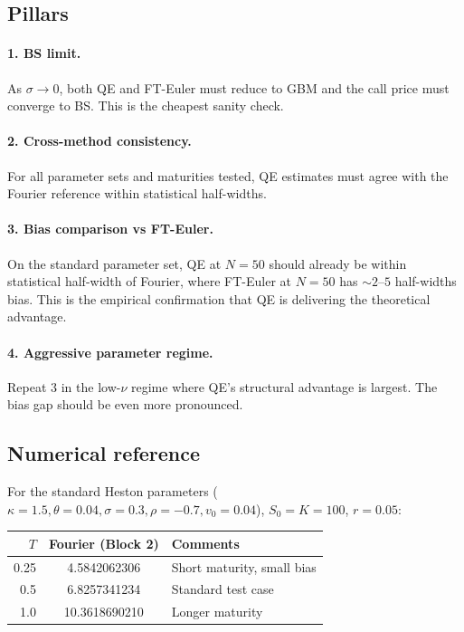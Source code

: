\documentclass[11pt]{article}
\theoremstyle{plain}
\theoremstyle{definition}
\theoremstyle{remark}
\begin{document}
\subsection{Pillars}

\paragraph{1. BS limit.} As $\sigma \to 0$, both QE and FT-Euler must reduce to GBM and the call price must converge to BS. This is the cheapest sanity check.

\paragraph{2. Cross-method consistency.} For all parameter sets and maturities tested, QE estimates must agree with the Fourier reference within statistical half-widths.

\paragraph{3. Bias comparison vs FT-Euler.} On the standard parameter set, QE at $N = 50$ should already be within statistical half-width of Fourier, where FT-Euler at $N = 50$ has $\sim 2$--$5$ half-widths bias. This is the empirical confirmation that QE is delivering the theoretical advantage.

\paragraph{4. Aggressive parameter regime.} Repeat 3 in the low-$\nu$ regime where QE's structural advantage is largest. The bias gap should be even more pronounced.

\subsection{Numerical reference}

For the standard Heston parameters ($\kappa = 1.5, \theta = 0.04, \sigma = 0.3, \rho = -0.7, v_0 = 0.04$), $S_0 = K = 100$, $r = 0.05$:

\begin{center}
\begin{tabular}{rcl}
\toprule
$T$ & Fourier (Block 2) & Comments \\
\midrule
0.25 & 4.5842062306 & Short maturity, small bias \\
0.5  & 6.8257341234 & Standard test case \\
1.0  & 10.3618690210 & Longer maturity \\
\bottomrule
\end{tabular}
\end{center}
\end{document}
